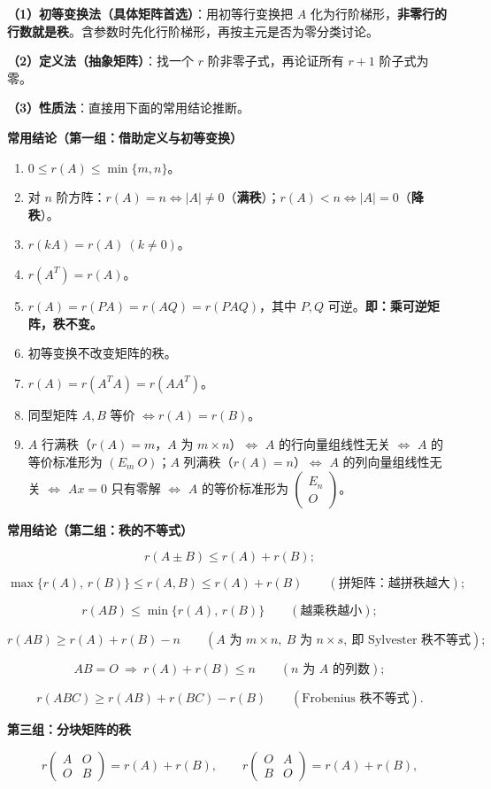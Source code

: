 \documentclass[11pt,openany,UTF8]{ctexbook}
\begin{document}
\textbf{（1）初等变换法（具体矩阵首选）}：用初等行变换把 $A$ 化为行阶梯形，\textbf{非零行的行数就是秩}。含参数时先化行阶梯形，再按主元是否为零分类讨论。

\textbf{（2）定义法（抽象矩阵）}：找一个 $r$ 阶非零子式，再论证所有 $r+1$ 阶子式为零。

\textbf{（3）性质法}：直接用下面的常用结论推断。

\textbf{常用结论（第一组：借助定义与初等变换）}

\begin{enumerate}
\item $0\le r(A)\le\min\{m,n\}$。
\item 对 $n$ 阶方阵：$r(A)=n\iff\vert A\vert\ne0$（\textbf{满秩}）；$r(A)<n\iff\vert A\vert=0$（\textbf{降秩}）。
\item $r(kA)=r(A)\ (k\ne0)$。
\item $r(A^T)=r(A)$。
\item $r(A)=r(PA)=r(AQ)=r(PAQ)$，其中 $P,Q$ 可逆。\textbf{即：乘可逆矩阵，秩不变。}
\item 初等变换不改变矩阵的秩。
\item $r(A)=r(A^TA)=r(AA^T)$。
\item 同型矩阵 $A,B$ 等价 $\iff r(A)=r(B)$。
\item $A$ 行满秩（$r(A)=m$，$A$ 为 $m\times n$）$\iff$ $A$ 的行向量组线性无关 $\iff$ $A$ 的等价标准形为 $(E_m\ O)$；$A$ 列满秩（$r(A)=n$）$\iff$ $A$ 的列向量组线性无关 $\iff$ $Ax=0$ 只有零解 $\iff$ $A$ 的等价标准形为 $\begin{pmatrix}E_n\\O\end{pmatrix}$。
\end{enumerate}
\textbf{常用结论（第二组：秩的不等式）}

\[r(A\pm B)\le r(A)+r(B);\]

\[\max\{r(A),\,r(B)\}\le r(A,B)\le r(A)+r(B)\qquad(\text{拼矩阵：越拼秩越大});\]

\[r(AB)\le\min\{r(A),\,r(B)\}\qquad(\text{越乘秩越小});\]

\[r(AB)\ge r(A)+r(B)-n\qquad(A\text{ 为 }m\times n,\ B\text{ 为 }n\times s,\ \text{即 Sylvester 秩不等式});\]

\[AB=O\ \Longrightarrow\ r(A)+r(B)\le n\qquad(n\text{ 为 }A\text{ 的列数});\]

\[r(ABC)\ge r(AB)+r(BC)-r(B)\qquad(\text{Frobenius 秩不等式}).\]

\textbf{第三组：分块矩阵的秩}

\[r\begin{pmatrix}A&O\\O&B\end{pmatrix}=r(A)+r(B),\qquad r\begin{pmatrix}O&A\\B&O\end{pmatrix}=r(A)+r(B),\]
\end{document}
